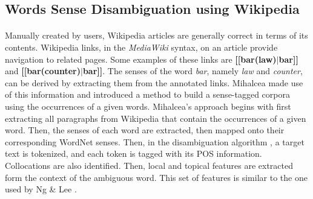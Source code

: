 \documentclass[12 pt]{article}
\begin{document}
%
%

\subsection{Words Sense Disambiguation using Wikipedia}
\label{wikipedia}
\paragraph{}
Manually created by users, Wikipedia articles are generally correct in terms of its contents. Wikipedia links, in the \textit{MediaWiki} syntax, on an article provide navigation to related pages. Some examples of these links are \textbf{[[bar(law)$|$bar]]} and \textbf{[[bar(counter)$|$bar]]}. The senses of the word \textit{bar}, namely \textit{law} and \textit{counter}, can be derived by extracting them from the annotated links. Mihalcea \cite{wikipedia} made use of this information and introduced a method to build a sense-tagged corpora using the occurrences of a given words. Mihalcea's approach begins with first extracting all paragraphs from Wikipedia that contain the occurrences of a given word. Then, the senses of each word are extracted, then mapped onto their corresponding WordNet senses. Then, in the disambiguation algorithm \cite{wikipedia}, a target text is tokenized, and each token is tagged with its POS information. Collocations are also identified. Then, local and topical features are extracted form the context of the ambiguous word. This set of features is similar to the one used by Ng \& Lee \cite{exemplar}.
\end{document}
